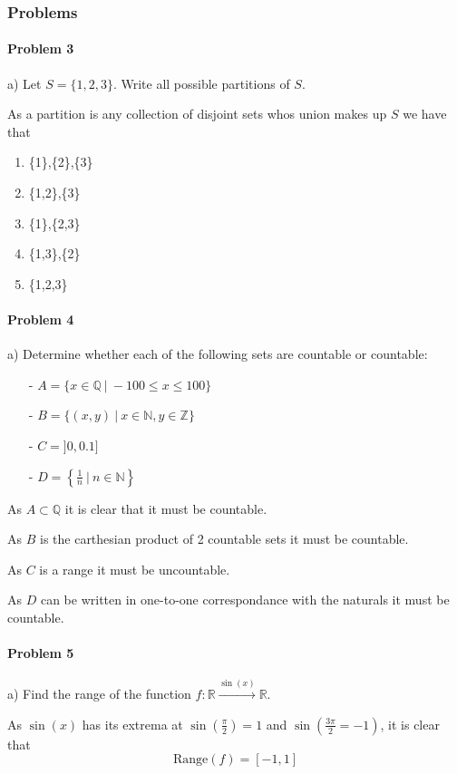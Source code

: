 \subsubsection{Problems}
\paragraph{Problem 3}
a) Let $S=\{1,2,3\}$. Write all possible partitions of $S$.

As a partition is any collection of disjoint sets whos union makes up $S$ we have that
\begin{enumerate}
  \item \{1\},\{2\},\{3\}
  \item \{1,2\},\{3\}
  \item \{1\},\{2,3\}
  \item \{1,3\},\{2\}
  \item \{1,2,3\}
\end{enumerate}

\paragraph{Problem 4}
a) Determine whether each of the following sets are countable or countable:
\begin{itemize}
    \item[-] $A=\{x\in \mathbb{Q}~|~-100\leq x\leq 100\}$
    \item[-] $B=\{(x,y)~|~x\in \mathbb{N},y \in \mathbb{Z}\}$
    \item[-] $C=]0,0.1]$
    \item[-] $D=\left\{\frac{1}{n}~|~n\in \mathbb{N}\right\}$
\end{itemize}

As $A\subset \mathbb{Q}$ it is clear that it must be countable.

As $B$ is the carthesian product of 2 countable sets it must be countable.

As $C$ is a range it must be uncountable.

As $D$ can be written in one-to-one correspondance with the naturals it must be countable.

\paragraph{Problem 5}
a) Find the range of the function $f: \mathbb{R} \xrightarrow{\sin(x)} \mathbb{R}$. 

As $\sin(x)$ has its extrema at $\sin\left(\frac{\pi}{2}\right)=1$ and $\sin\left(\frac{3\pi}{2}=-1\right)$, it is clear that
\[
    \text{Range}(f)=[-1,1]
\]
